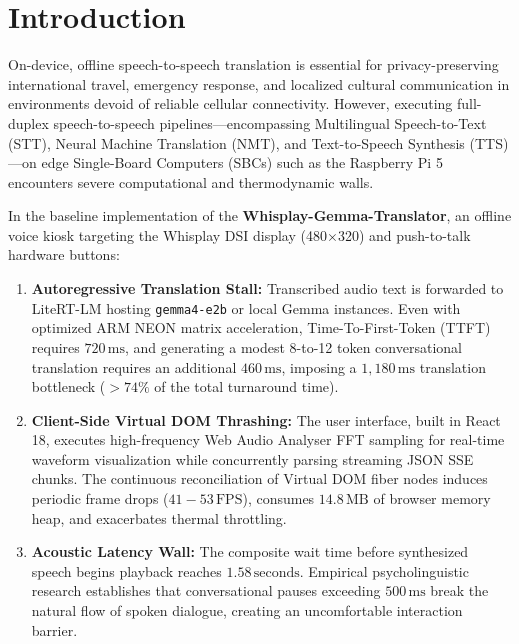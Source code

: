 \documentclass[11pt]{article}
\begin{document}
\section{Introduction}

On-device, offline speech-to-speech translation is essential for privacy-preserving international travel, emergency response, and localized cultural communication in environments devoid of reliable cellular connectivity. However, executing full-duplex speech-to-speech pipelines---encompassing Multilingual Speech-to-Text (STT), Neural Machine Translation (NMT), and Text-to-Speech Synthesis (TTS)---on edge Single-Board Computers (SBCs) such as the Raspberry Pi 5 encounters severe computational and thermodynamic walls.

In the baseline implementation of the \textbf{Whisplay-Gemma-Translator}, an offline voice kiosk targeting the Whisplay DSI display (480$\times$320) and push-to-talk hardware buttons:
\begin{enumerate}
    \item \textbf{Autoregressive Translation Stall:} Transcribed audio text is forwarded to LiteRT-LM hosting \texttt{gemma4-e2b} or local Gemma instances. Even with optimized ARM NEON matrix acceleration, Time-To-First-Token (TTFT) requires $720\,\text{ms}$, and generating a modest 8-to-12 token conversational translation requires an additional $460\,\text{ms}$, imposing a $1,180\,\text{ms}$ translation bottleneck ($>74\%$ of the total turnaround time).
    \item \textbf{Client-Side Virtual DOM Thrashing:} The user interface, built in React 18, executes high-frequency Web Audio Analyser FFT sampling for real-time waveform visualization while concurrently parsing streaming JSON SSE chunks. The continuous reconciliation of Virtual DOM fiber nodes induces periodic frame drops ($41 - 53\,\text{FPS}$), consumes $14.8\,\text{MB}$ of browser memory heap, and exacerbates thermal throttling.
    \item \textbf{Acoustic Latency Wall:} The composite wait time before synthesized speech begins playback reaches $1.58\,\text{seconds}$. Empirical psycholinguistic research establishes that conversational pauses exceeding $500\,\text{ms}$ break the natural flow of spoken dialogue, creating an uncomfortable interaction barrier.
\end{enumerate}
\end{document}
